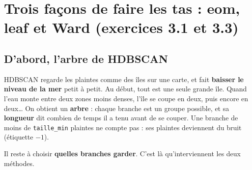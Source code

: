 
\newpage
\section{Trois façons de faire les tas : eom, leaf et Ward (exercices 3.1 et 3.3)}

\subsection{D'abord, l'arbre de HDBSCAN}

HDBSCAN regarde les plaintes comme des îles sur une carte, et fait \textbf{baisser le niveau de la mer}
petit à petit. Au début, tout est une seule grande île. Quand l'eau monte entre deux zones moins denses,
l'île se coupe en deux, puis encore en deux\ldots{} On obtient un \textbf{arbre} : chaque branche est un
groupe possible, et sa \textbf{longueur} dit combien de temps il a tenu avant de se couper. Une branche de
moins de \texttt{taille\_min} plaintes ne compte pas : ses plaintes deviennent du bruit (étiquette $-1$).

Il reste à choisir \textbf{quelles branches garder}. C'est là qu'interviennent les deux méthodes.

